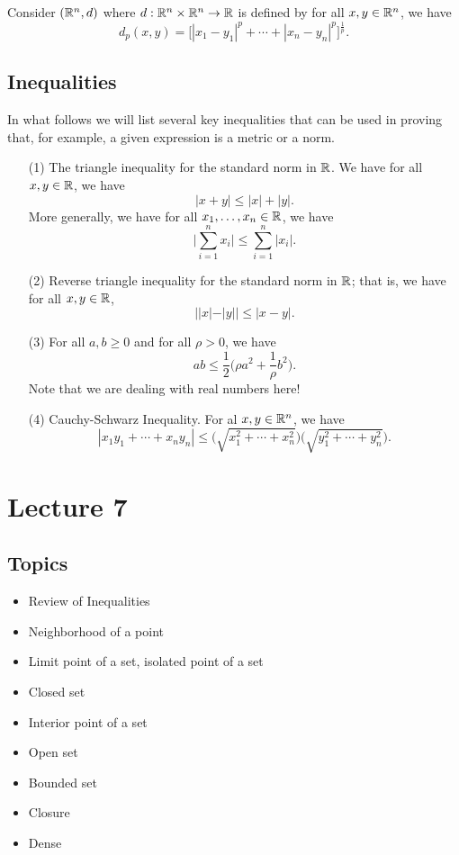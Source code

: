 \documentclass[a4paper]{report}
\begin{document}
\begin{eg}
   Consider \( (\mathbb{R}^{n} ,d) \) where \( d: \mathbb{R}^{n} \times \mathbb{R}^{n} \to \mathbb{R}  \) is defined by 
   for all \( x,y \in \mathbb{R}^{n} \), we have
   \[  {d}_{p}(x,y) = \Big[|  {x}_{1} - {y}_{1} |^{p } + \cdots + | {x}_{n} - {y}_{n} |^{p} \Big]^{\frac{ 1 }{ p } }. \]
\end{eg}

\subsection{Inequalities}

In what follows we will list several key inequalities that can be used in proving that, for example, a given expression is a metric or a norm.
\begin{enumerate}
    \item[(1)] The triangle inequality for the standard norm in \( \mathbb{R}  \). We have for all \( x,y \in \mathbb{R}  \), we have 
        \[  |  x + y  |  \leq | x  |  + | y |. \]
        More generally, we have for all \( {x}_{1}, \dots, {x}_{n} \in \mathbb{R}  \), we have
        \[  \Big| \sum_{ i=1  }^{ n } {x}_{i} \Big|  \leq \sum_{ i=1  }^{ n } | {x}_{i} |. \]
    \item[(2)] Reverse triangle inequality for the standard norm in \( \mathbb{R} \); that is, we have for all \( x,y \in \mathbb{R}  \), 
        \[  | |  x  |  - | y |  |  \leq |  x  - y  |. \]
    \item[(3)] For all \( a,b \geq 0  \) and for all \( \rho > 0  \), we have 
        \[  ab \leq \frac{ 1 }{ 2 }  \Big(\rho a^{2} + \frac{ 1 }{ \rho }  b^{2} \Big). \]
        Note that we are dealing with real numbers here!
    \item[(4)] Cauchy-Schwarz Inequality. For al \( x,y \in \mathbb{R}^{n} \), we have
        \[  |  {x}_{1} {y}_{1} + \cdots + {x}_{n}{y}_{n}  |  \leq \Big(  \sqrt{  {x}_{1}^{2} + \cdots + {x}_{n}^{2} }  \Big) \Big(  \sqrt{ {y}_{1}^{2} + \cdots + {y}_{n}^{2} }  \Big) \tag{*}.  \]
\end{enumerate}

\section{Lecture 7}

\subsection{Topics}

\begin{itemize}
    \item Review of Inequalities
    \item Neighborhood of a point
    \item Limit point of a set, isolated point of a set
    \item Closed set
    \item Interior point of a set
    \item Open set
    \item Bounded set
    \item Closure
    \item Dense
\end{itemize}
\end{document}
